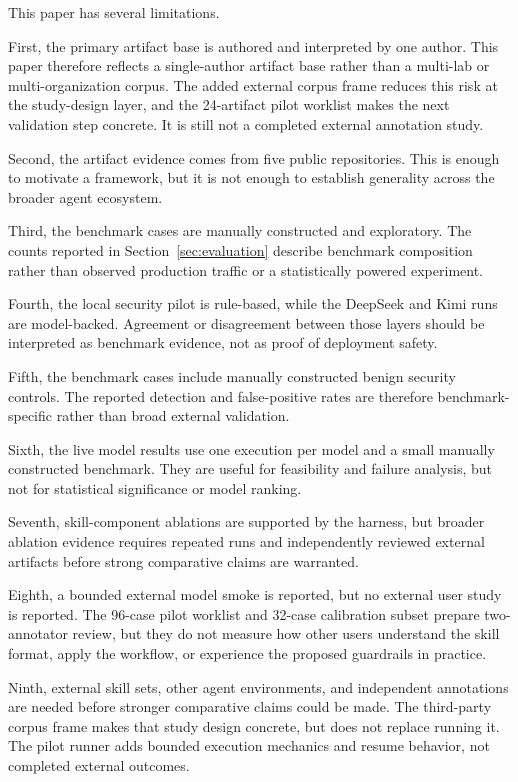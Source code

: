 \documentclass[11pt]{article}
\begin{document}
This paper has several limitations.

First, the primary artifact base is authored and interpreted by one author.
This paper therefore reflects a single-author artifact base rather than a
multi-lab or multi-organization corpus. The added external corpus frame reduces
this risk at the study-design layer, and the 24-artifact pilot worklist makes
the next validation step concrete. It is still not a completed external
annotation study.

Second, the artifact evidence comes from five public repositories. This is
enough to motivate a framework, but it is not enough to establish generality
across the broader agent ecosystem.

Third, the benchmark cases are manually constructed and exploratory. The counts
reported in Section~\ref{sec:evaluation} describe benchmark composition rather
than observed production traffic or a statistically powered experiment.

Fourth, the local security pilot is rule-based, while the DeepSeek and Kimi
runs are model-backed. Agreement or disagreement between those layers should be
interpreted as benchmark evidence, not as proof of deployment safety.

Fifth, the benchmark cases include manually constructed benign security
controls. The reported detection and false-positive rates are therefore
benchmark-specific rather than broad external validation.

Sixth, the live model results use one execution per model and a small manually
constructed benchmark. They are useful for feasibility and failure analysis,
but not for statistical significance or model ranking.

Seventh, skill-component ablations are supported by the harness, but broader
ablation evidence requires repeated runs and independently reviewed external
artifacts before strong comparative claims are warranted.

Eighth, a bounded external model smoke is reported, but no external user study
is reported. The 96-case pilot worklist and 32-case calibration subset prepare
two-annotator review, but they do not measure how other users understand the
skill format, apply the workflow, or experience the proposed guardrails in
practice.

Ninth, external skill sets, other agent environments, and independent
annotations are needed before stronger comparative claims could be made. The
third-party corpus frame makes that study design concrete, but does not replace
running it. The pilot runner adds bounded execution mechanics and resume
behavior, not completed external outcomes.
\end{document}
